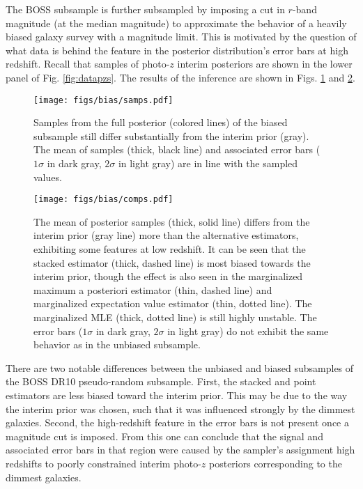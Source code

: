 The BOSS subsample is further subsampled by imposing a cut in $r$-band 
magnitude (at the median magnitude) to approximate the behavior of a heavily 
biased galaxy survey with a magnitude limit.  This is motivated by the question 
of what data is behind the feature in the posterior distribution's error bars 
at high redshift.  Recall that samples of photo-$z$ interim posteriors are 
shown in the lower panel of Fig. \ref{fig:datapzs}.  The results of the 
inference are shown in Figs. \ref{fig:biasparam} and \ref{fig:biascomp}.  

\begin{figure}
	\texttt{[image: figs/bias/samps.pdf]}
	\caption{Samples from the full posterior (colored lines) of the biased 
		subsample still differ substantially from the interim prior (gray).  The mean 
		of samples (thick, black line) and associated error bars ($1\sigma$ in dark 
		gray, $2\sigma$ in light gray) are in line with the sampled values.}
	\label{fig:biasparam}
\end{figure}

\begin{figure}
	\texttt{[image: figs/bias/comps.pdf]}
	\caption{The mean of posterior samples (thick, solid line) differs from the 
		interim prior (gray line) more than the alternative estimators, exhibiting some 
		features at low redshift.  It can be seen that the stacked estimator (thick, 
		dashed line) is most biased towards the interim prior, though the effect is 
		also seen in the marginalized maximum a posteriori estimator (thin, dashed 
		line) and marginalized expectation value estimator (thin, dotted line).  The 
		marginalized MLE (thick, dotted line) is still highly unstable.  The error bars 
		($1\sigma$ in dark gray, $2\sigma$ in light gray) do not exhibit the same 
		behavior as in the unbiased subsample.}
	\label{fig:biascomp}
\end{figure}

There are two notable differences between the unbiased and biased subsamples of 
the BOSS DR10 pseudo-random subsample.  First, the stacked and point estimators 
are less biased toward the interim prior.  This may be due to the way the 
interim prior was chosen, such that it was influenced strongly by the dimmest 
galaxies.  Second, the high-redshift feature in the error bars is not present 
once a magnitude cut is imposed.  From this one can conclude that the signal 
and associated error bars in that region were caused by the sampler's 
assignment high redshifts to poorly constrained interim photo-$z$ posteriors 
corresponding to the dimmest galaxies.  

